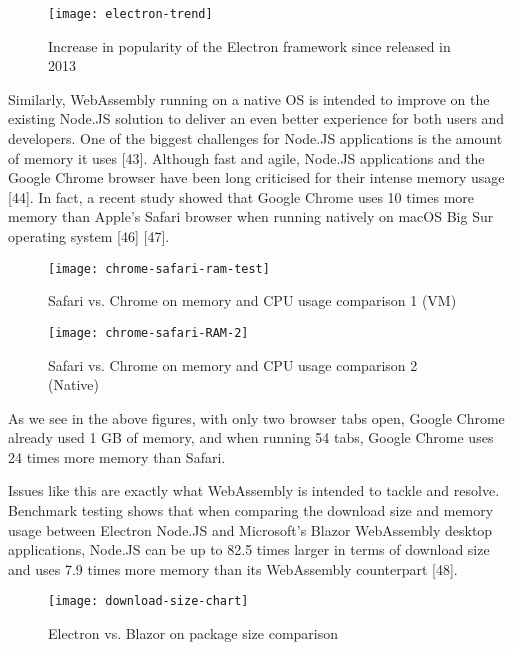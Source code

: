 \newpage
\bigskip
\begin{figure}[hp]
\centering
\texttt{[image: electron-trend]}
\caption{\footnotesize{Increase in popularity of the Electron framework since released in 2013}}
\captionsetup{aboveskip=0pt,font=it}
\end{figure}
\bigskip

Similarly, WebAssembly running on a native OS is intended to improve on the existing Node.JS solution to deliver an even better experience for both users and developers. One of the biggest challenges for Node.JS applications is the amount of memory it uses [43]. Although fast and agile, Node.JS applications and the Google Chrome browser have been long criticised for their intense memory usage [44]. In fact, a recent study showed that Google Chrome uses 10 times more memory than Apple's Safari browser when running natively on macOS Big Sur operating system [46] [47].

\newpage

\bigskip
\begin{figure}[hp]
\centering
\texttt{[image: chrome-safari-ram-test]}
\caption{\footnotesize{Safari vs. Chrome on memory and CPU usage comparison 1 (VM)}}
\captionsetup{aboveskip=0pt,font=it}
\end{figure}
\bigskip

\bigskip
\begin{figure}[hp]
\centering
\texttt{[image: chrome-safari-RAM-2]}
\caption{\footnotesize{Safari vs. Chrome on memory and CPU usage comparison 2 (Native)}}
\captionsetup{aboveskip=0pt,font=it}
\end{figure}
\bigskip

As we see in the above figures, with only two browser tabs open, Google Chrome already used 1 GB of memory, and when running 54 tabs, Google Chrome uses 24 times more memory than Safari.

Issues like this are exactly what WebAssembly is intended to tackle and resolve. Benchmark testing shows that when comparing the download size and memory usage between Electron Node.JS and Microsoft's Blazor WebAssembly desktop applications, Node.JS can be up to 82.5 times larger in terms of download size and uses 7.9 times more memory than its WebAssembly counterpart [48].

\bigskip
\begin{figure}[hp]
\centering
\texttt{[image: download-size-chart]}
\caption{\footnotesize{Electron vs. Blazor on package size comparison}}
\captionsetup{aboveskip=0pt,font=it}
\end{figure}
\bigskip

